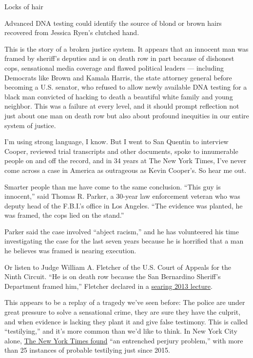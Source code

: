 Locks of hair

Advanced DNA testing could identify the source of blond or brown hairs
recovered from Jessica Ryen's clutched hand.

This is the story of a broken justice system. It appears that an
innocent man was framed by sheriff's deputies and is on death row in
part because of dishonest cops, sensational media coverage and flawed
political leaders --- including Democrats like Brown and Kamala Harris,
the state attorney general before becoming a U.S. senator, who refused
to allow newly available DNA testing for a black man convicted of
hacking to death a beautiful white family and young neighbor. This was a
failure at every level, and it should prompt reflection not just about
one man on death row but also about profound inequities in our entire
system of justice.

I'm using strong language, I know. But I went to San Quentin to
interview Cooper, reviewed trial transcripts and other documents, spoke
to innumerable people on and off the record, and in 34 years at The New
York Times, I've never come across a case in America as outrageous as
Kevin Cooper's. So hear me out.

Smarter people than me have come to the same conclusion. ``This guy is
innocent,'' said Thomas R. Parker, a 30-year law enforcement veteran who
was deputy head of the F.B.I.'s office in Los Angeles. ``The evidence
was planted, he was framed, the cops lied on the stand.''

Parker said the case involved ``abject racism,'' and he has volunteered
his time investigating the case for the last seven years because he is
horrified that a man he believes was framed is nearing execution.

Or listen to Judge William A. Fletcher of the U.S. Court of Appeals for
the Ninth Circuit. ``He is on death row because the San Bernardino
Sheriff's Department framed him,'' Fletcher declared in a
\href{http://www.nyulawreview.org/sites/default/files/pdf/NYULawReview-89-3-Fletcher_0.pdf}{searing
2013 lecture}.

This appears to be a replay of a tragedy we've seen before: The police
are under great pressure to solve a sensational crime, they are sure
they have the culprit, and when evidence is lacking they plant it and
give false testimony. This is called ``testilying,'' and it's more
common than we'd like to think. In New York City alone,
\href{https://www.nytimes3xbfgragh.onion/2018/03/18/nyregion/testilying-police-perjury-new-york.html}{The
New York Times found} ``an entrenched perjury problem,'' with more than
25 instances of probable testilying just since 2015.

